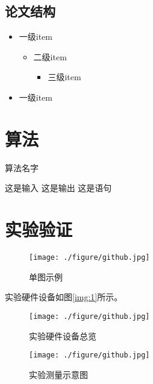 \documentclass[winfonts,master,twoside]{njuthesis}
\begin{document}
\section{论文结构}
\lipsum[1]
\begin{itemize}
\item 一级item
 \begin{itemize}
 \item 二级item
	\begin{itemize}
	\item 三级item

	\end{itemize}

 \end{itemize}
\item 一级item

\end{itemize}


\chapter{算法}

\begin{algorithm}[htbp]
  \caption{算法名字}
  \label{alg:alg1}
  \begin{algorithmic}[1]
        \REQUIRE 这是输入
        \ENSURE 这是输出
		      \STATE 这是语句
        \ENDWHILE
  \end{algorithmic}
\end{algorithm}

\chapter{实验验证}

\begin{figure}[htbp]
  \centering
  \texttt{[image: ./figure/github.jpg]}
  \caption{单图示例}
  \label{fig:system}
\end{figure}

实验硬件设备如图\ref{img:1}所示。
\begin{figure}[htbp]
\begin{minipage}[t]{0.5\textwidth}
\centering
\texttt{[image: ./figure/github.jpg]}
\caption{实验硬件设备总览}
\label{img:1}
\end{minipage}
\begin{minipage}[t]{0.5\textwidth}
\centering
\texttt{[image: ./figure/github.jpg]}
\caption{实验测量示意图}
\label{img:2}
\end{minipage}
\end{figure}
\end{document}
